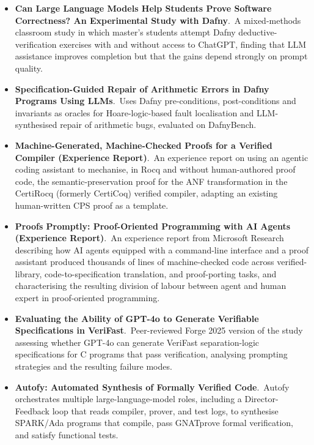 \documentclass[natbib=false,acmsmall,nonacm,11pt]{acmart}
\begin{document}
\begin{itemize}
\item \textbf{Can Large Language Models Help Students Prove Software Correctness? An Experimental Study with Dafny}.~A mixed-methods classroom study in which master's students attempt Dafny deductive-verification exercises with and without access to ChatGPT, finding that LLM assistance improves completion but that the gains depend strongly on prompt quality.~\cite{DBLP:conf/sefm/CarreiraSAM25}
\item \textbf{Specification-Guided Repair of Arithmetic Errors in Dafny Programs Using LLMs}.~Uses Dafny pre-conditions, post-conditions and invariants as oracles for Hoare-logic-based fault localisation and LLM-synthesised repair of arithmetic bugs, evaluated on DafnyBench.~\cite{DBLP:conf/sefm/WuMA25}
\item \textbf{Machine-Generated, Machine-Checked Proofs for a Verified Compiler (Experience Report)}.~An experience report on using an agentic coding assistant to mechanise, in Rocq and without human-authored proof code, the semantic-preservation proof for the ANF transformation in the CertiRocq (formerly CertiCoq) verified compiler, adapting an existing human-written CPS proof as a template.~\cite{DBLP:journals/pacmpl/Paraskevopoulou26}
\item \textbf{Proofs Promptly: Proof-Oriented Programming with AI Agents (Experience Report)}.~An experience report from Microsoft Research describing how AI agents equipped with a command-line interface and a proof assistant produced thousands of lines of machine-checked code across verified-library, code-to-specification translation, and proof-porting tasks, and characterising the resulting division of labour between agent and human expert in proof-oriented programming.~\cite{DBLP:journals/pacmpl/IoannidisSEPR26}
\item \textbf{Evaluating the Ability of GPT-4o to Generate Verifiable Specifications in VeriFast}.~Peer-reviewed Forge 2025 version of the study assessing whether GPT-4o can generate VeriFast separation-logic specifications for C programs that pass verification, analysing prompting strategies and the resulting failure modes.~\cite{DBLP:conf/forge/RegoFHDNXDT25}
\item \textbf{Autofy: Automated Synthesis of Formally Verified Code}.~Autofy orchestrates multiple large-language-model roles, including a Director-Feedback loop that reads compiler, prover, and test logs, to synthesise SPARK/Ada programs that compile, pass GNATprove formal verification, and satisfy functional tests.~\cite{DBLP:conf/icse-formalise/PurschkeSKWK26}

\end{itemize}
\end{document}
